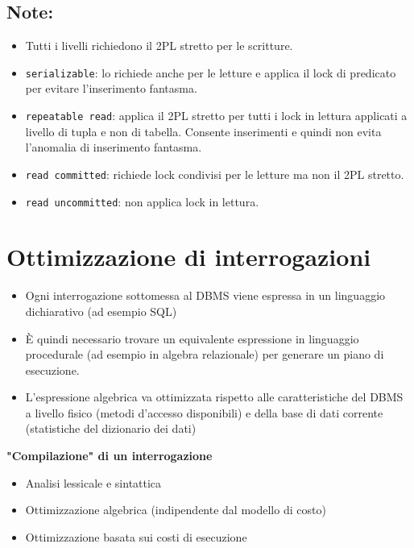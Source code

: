 \documentclass[a4paper, 10pt]{article}
\theoremstyle{definition}
\begin{document}
		\subsection*{Note:}
		\begin{itemize}
			\item Tutti i livelli richiedono il 2PL stretto per le scritture.
			\item \lstinline|serializable|: lo richiede anche per le letture e applica il
			lock di predicato per evitare l'inserimento fantasma.
			\item \lstinline|repeatable read|: applica il 2PL stretto per tutti i lock in
			lettura applicati a livello di tupla e non di tabella. Consente
			inserimenti e quindi non evita l'anomalia di inserimento
			fantasma.
			\item \lstinline|read committed|: richiede lock condivisi per le letture ma
			non il 2PL stretto.
			\item \lstinline|read uncommitted|: non applica lock in lettura.
		\end{itemize}
		
	\section{Ottimizzazione di interrogazioni}
		\begin{itemize}
			\item Ogni interrogazione sottomessa al DBMS viene
			espressa in un linguaggio dichiarativo (ad esempio
			SQL)
			\item È quindi necessario trovare un equivalente
			espressione in linguaggio procedurale (ad esempio
			in algebra relazionale) per generare un piano di
			esecuzione.
			\item L'espressione algebrica va ottimizzata rispetto alle
			caratteristiche del DBMS a livello fisico (metodi
			d'accesso disponibili) e della base di dati corrente
			(statistiche del dizionario dei dati)
		\end{itemize}
		
		\noindent
		\textbf{"Compilazione" di un interrogazione}
			\begin{itemize}
				\item Analisi lessicale e sintattica
				\item Ottimizzazione algebrica (indipendente dal modello di costo)
				\item Ottimizzazione basata sui costi di esecuzione
			\end{itemize}
			
\end{document}
